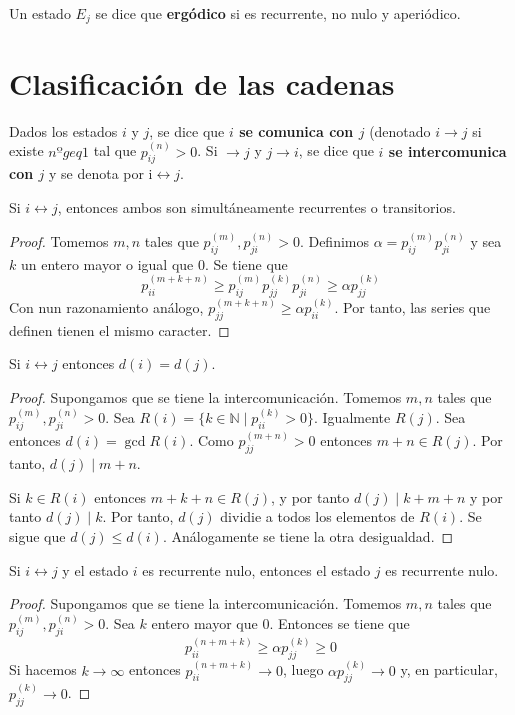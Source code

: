 \documentclass[PREyA.tex]{subfiles}
\begin{document}
\newpage
\begin{defi}
Un estado $E_j$ se dice que \textbf{ergódico} si es recurrente, no nulo y aperiódico.
\end{defi}

\section{Clasificación de las cadenas}
\begin{defi}
Dados los estados $i$ y $j$, se dice que \textbf{$i$ se comunica con $j$} (denotado $i\to j$ si existe $nºgeq 1$ tal que $p_{ij}^{(n)}>0$. Si $\to j$ y $j\to i$, se dice que \textbf{$i$ se intercomunica con $j$}  y se denota por i$\leftrightarrow j$.
\end{defi}
\begin{prop}
Si $i\leftrightarrow j$, entonces ambos son simultáneamente recurrentes o transitorios.
\end{prop}
\begin{proof}
Tomemos $m,n$ tales que $p^{(m)}_{ij},p^{(n)}_{ji}>0$. Definimos $\alpha =p^{(m)}_{ij}p^{(n)}_{ji}$ y sea $k$ un entero mayor o igual que $0$. Se tiene que 
$$
p_{ii}^{(m+k+n)} \geq p^{(m)}_{ij}p_{jj}^{(k)}p^{(n)}_{ji}\geq \alpha p_{jj}^{(k)}
$$
Con nun razonamiento análogo, $p_{jj}^{(m+k+n)}\geq \alpha p_{ii}^{(k)}$. Por tanto, las series que definen tienen el mismo caracter.
\end{proof}
\begin{prop}
Si $i\leftrightarrow j$ entonces $d(i)=d(j)$.
\end{prop}
\begin{proof}
Supongamos que se tiene la intercomunicación. Tomemos $m,n$ tales que $p^{(m)}_{ij},p^{(n)}_{ji}>0$. Sea $R(i) = \{k\in \mathbb{N} \mid p_{ii}^{(k)}>0\}$. Igualmente $R(j)$. Sea entonces $d(i)=\gcd R(i)$. Como $p_{jj}^{(m+n)}>0$ entonces $m+n \in R(j)$. Por tanto, $d(j)\mid m+n$.

Si $k\in R(i)$ entonces $m+k+n \in R(j)$, y por tanto $d(j)\mid k+m+n$ y por tanto $d(j)\mid k$. Por tanto, $d(j)$ dividie a todos los elementos de $R(i)$. Se sigue que $d(j) \leq d(i)$. Análogamente se tiene la otra desigualdad.
\end{proof}
\begin{prop}
Si $i\leftrightarrow j$ y el estado $i$ es recurrente nulo, entonces el estado $j$ es recurrente nulo.
\end{prop}
\begin{proof}
Supongamos que se tiene la intercomunicación. Tomemos $m,n$ tales que $p^{(m)}_{ij},p^{(n)}_{ji}>0$. Sea $k$ entero mayor que $0$. Entonces se tiene que
$$
p_{ii}^{(n+m+k)} \geq \alpha p_{jj}^{(k)}\geq 0
$$
Si hacemos $k\to \infty$ entonces $p_{ii}^{(n+m+k)} \to 0$, luego $\alpha p_{jj}^{(k)} \to 0$ y, en particular, $p_{jj}^{(k)} \to 0$.
\end{proof}
\end{document}
